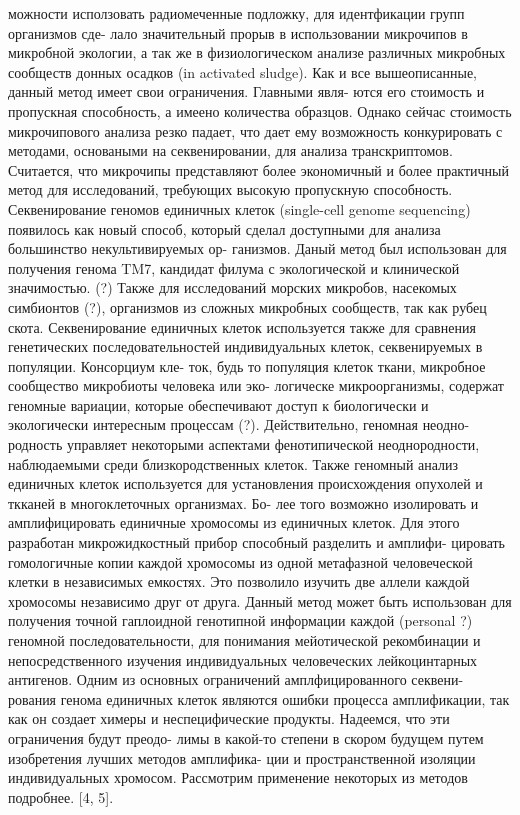 можности исползовать радиомеченные подложку, для идентфикации групп организмов сде-
лало значительный прорыв в использовании микрочипов в микробной экологии, а так же
в физиологическом анализе различных микробных сообществ донных осадков (in activated
sludge). Как и все вышеописанные, данный метод имеет свои ограничения. Главными явля-
ются его стоимость и пропускная способность, а имеено количества образцов. Однако сейчас
стоимость микрочипового анализа резко падает, что дает ему возможность конкурировать
с методами, основаными на секвенировании, для анализа транскриптомов. Считается, что
микрочипы представляют более экономичный и более практичный метод для исследований,
требующих высокую пропускную способность.
Секвенирование геномов единичных клеток (single-cell genome sequencing) появилось как
новый способ, который сделал доступными для анализа большинство некультивируемых ор-
ганизмов. Даный метод был использован для получения генома TM7, кандидат филума с
экологической и клинической значимостью. (?) Также для исследований морских микробов,
насекомых симбионтов (?), организмов из сложных микробных сообществ, так как рубец
скота. Секвенирование единичных клеток используется также для сравнения генетических
последовательностей индивидуальных клеток, секвенируемых в популяции. Консорциум кле-
ток, будь то популяция клеток ткани, микробное сообщество микробиоты человека или эко-
логическе микроорганизмы, содержат геномные вариации, которые обеспечивают доступ к
биологически и экологически интересным процессам (?). Действительно, геномная неодно-
родность управляет некоторыми аспектами фенотипической неоднородности, наблюдаемыми
среди близкородственных клеток. Также геномный анализ единичных клеток используется
для установления происхождения опухолей и ткканей в многоклеточных организмах. Бо-
лее того возможно изолировать и амплифицировать единичные хромосомы из единичных
клеток. Для этого разработан микрожидкостный прибор способный разделить и амплифи-
цировать гомологичные копии каждой хромосомы из одной метафазной человеческой клетки
в независимых емкостях. Это позволило изучить две аллели каждой хромосомы независимо
друг от друга. Данный метод может быть использован для получения точной гаплоидной
генотипной информации каждой (personal ?) геномной последовательности, для понимания
мейотической рекомбинации и непосредственного изучения индивидуальных человеческих
лейкоцинтарных антигенов. Одним из основных ограничений амплфицированного секвени-
рования генома единичных клеток являются ошибки процесса амплификации, так как он
создает химеры и неспецифические продукты. Надеемся, что эти ограничения будут преодо-
лимы в какой-то степени в скором будущем путем изобретения лучших методов амплифика-
ции и пространственной изоляции индивидуальных хромосом.
Рассмотрим применение некоторых из методов подробнее. [4, 5].

